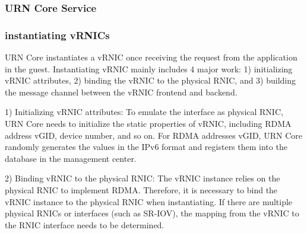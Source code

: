 \subsubsection{URN Core Service}

\subsubsection{instantiating vRNICs}
URN Core instantiates a vRNIC once receiving the request from the application in the guest. Instantiating vRNIC mainly includes 4 major work: 1) initializing vRNIC attributes, 2) binding the vRNIC to the physical RNIC, and 3) building the message channel between the vRNIC frontend and backend.

1) Initializing vRNIC attributes: To emulate the interface as physical RNIC, URN Core needs to initialize the static properties of vRNIC, including RDMA address vGID, device number, and so on. For RDMA addresses vGID, URN Core randomly generates the values in the IPv6 format and registers them into the database in the management center.

2) Binding vRNIC to the physical RNIC: The vRNIC instance relies on the physical RNIC to implement RDMA. Therefore, it is necessary to bind the vRNIC instance to the physical RNIC when instantiating. If there are multiple physical RNICs or interfaces (such as SR-IOV), the mapping from the vRNIC to the RNIC interface needs to be determined.

